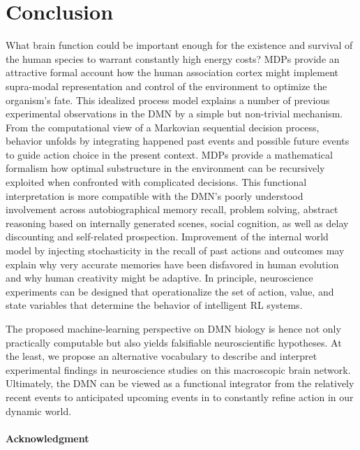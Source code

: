 \documentclass[10pt,letterpaper]{article}
\begin{document}
\section{Conclusion}
What brain function could be important enough
for the existence and survival of the human species
to warrant constantly high energy costs?
MDPs provide an attractive
formal account how the human association cortex
might implement supra-modal representation and control of the environment to
optimize the organism's fate.
This idealized process model explains
a number of previous experimental observations in the
DMN by a simple but non-trivial mechanism.
%
From the computational view of a Markovian sequential decision process,
behavior unfolds by integrating happened past events
and possible future events to guide action choice in the present context.
MDPs provide a mathematical formalism how
optimal substructure in the environment can be recursively exploited
when confronted with complicated decisions.
%
This functional interpretation is more compatible with the DMN's
poorly understood involvement across
autobiographical memory recall, problem solving,
abstract reasoning based on internally generated scenes, social cognition,
as well as delay discounting and self-related prospection.
Improvement of the internal world model
by injecting stochasticity in the recall of past
actions and outcomes may explain why
very accurate memories have been disfavored in human evolution
and why human creativity might be adaptive.
%
In principle,
neuroscience experiments can be designed that operationalize
the set of action, value, and state variables that determine
the behavior of intelligent RL systems.



The proposed machine-learning perspective
on DMN biology is hence not only practically computable but
also yields falsifiable neuroscientific hypotheses.
%
At the least, we propose an alternative vocabulary to
describe and interpret experimental findings in neuroscience studies
on this macroscopic brain network.
%
Ultimately,
the DMN can be viewed as a functional integrator
from the relatively recent events to anticipated upcoming events
in to constantly refine action in our dynamic world.



\paragraph{Acknowledgment}
\end{document}
